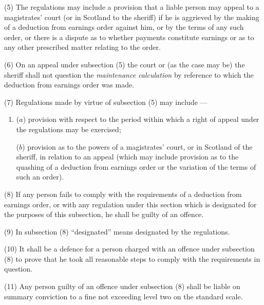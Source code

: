 \documentclass[12pt,a4paper]{article}
\begin{document}
(5) The regulations may include a provision that a liable person may appeal to a magistrates' court (or in Scotland to the sheriff) if he is aggrieved by the making of a deduction from earnings order against him, or by the terms of any such order, or there is a dispute as to whether payments constitute earnings or as to any other prescribed matter relating to the order.

(6) On an appeal under subsection (5)  the court or (as the case may be) the sheriff shall not question the 
\emph{maintenance calculation}  %
by reference to which the deduction from earnings order was made.

(7) Regulations made by virtue of subsection (5)  may include%
—
\begin{enumerate}\item[]
($a$) provision with respect to the period within which a right of appeal under the regulations may be exercised;

($b$)  %
provision as to the powers of a magistrates' court, or in Scotland of the sheriff, in relation to an appeal (which may include provision as to the quashing of a deduction from earnings order or the variation of the terms of such an order).
\end{enumerate}

(8) If any person fails to comply with the requirements of a deduction from earnings order, or with any regulation under this section which is designated for the purposes of this subsection, he shall be guilty of an offence.

(9) In subsection (8)  “designated” means designated by the regulations.

(10) It shall be a defence for a person charged with an offence under subsection (8)  to prove that he took all reasonable steps to comply with the requirements in question.

(11) Any person guilty of an offence under subsection (8)  shall be liable on summary conviction to a fine not exceeding level two on the standard scale.

\end{document}
